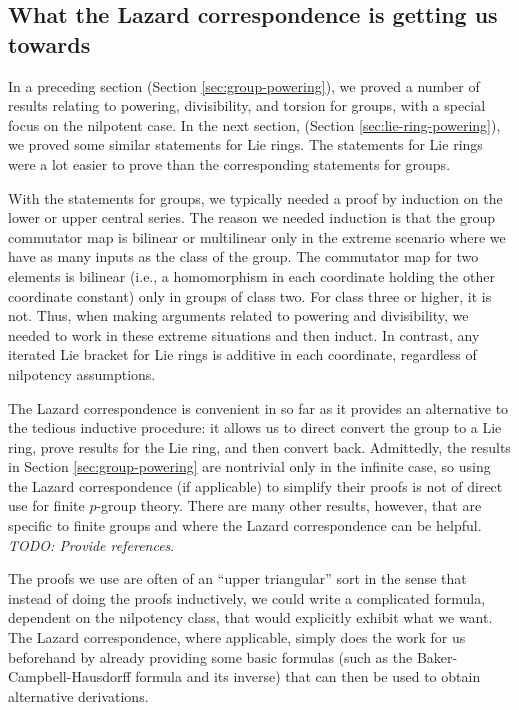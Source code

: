 \subsection{What the Lazard correspondence is getting us towards}

In a preceding section (Section \ref{sec:group-powering}), we proved a
number of results relating to powering, divisibility, and torsion for
groups, with a special focus on the nilpotent case. In the next
section, (Section \ref{sec:lie-ring-powering}), we proved some similar
statements for Lie rings. The statements for Lie rings were a lot
easier to prove than the corresponding statements for groups.

With the statements for groups, we typically needed a proof by
induction on the lower or upper central series. The reason we needed
induction is that the group commutator map is bilinear or multilinear
only in the extreme scenario where we have as many inputs as the class
of the group. The commutator map for two elements is bilinear (i.e., a
homomorphism in each coordinate holding the other coordinate constant)
only in groups of class two. For class three or higher, it is
not. Thus, when making arguments related to powering and divisibility,
we needed to work in these extreme situations and then induct. In
contrast, any iterated Lie bracket for Lie rings is additive in each
coordinate, regardless of nilpotency assumptions.

The Lazard correspondence is convenient in so far as it provides an
alternative to the tedious inductive procedure: it allows us to direct
convert the group to a Lie ring, prove results for the Lie ring, and
then convert back. Admittedly, the results in Section
\ref{sec:group-powering} are nontrivial only in the infinite case, so
using the Lazard correspondence (if applicable) to simplify their
proofs is not of direct use for finite $p$-group theory. There are
many other results, however, that are specific to finite groups and
where the Lazard correspondence can be helpful. {\em TODO: Provide
  references}.

The proofs we use are often of an ``upper triangular'' sort in the
sense that instead of doing the proofs inductively, we could write a
complicated formula, dependent on the nilpotency class, that would
explicitly exhibit what we want. The Lazard correspondence, where
applicable, simply does the work for us beforehand by already
providing some basic formulas (such as the Baker-Campbell-Hausdorff
formula and its inverse) that can then be used to obtain alternative
derivations.


